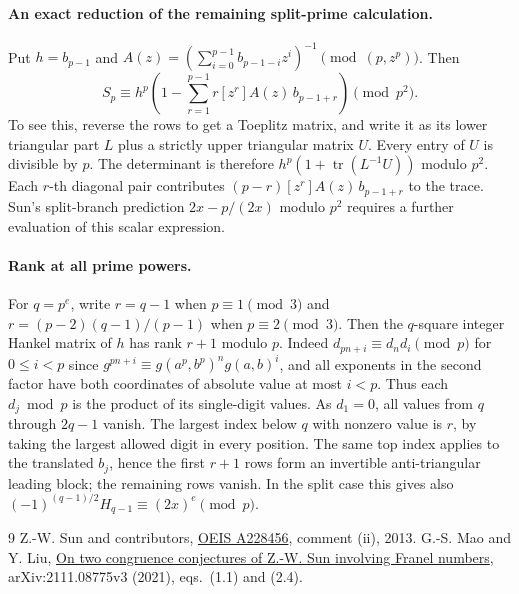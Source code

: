 \documentclass[11pt]{article}
\begin{document}
\paragraph{An exact reduction of the remaining split-prime calculation.}
Put $h=b_{p-1}$ and $A(z)=(\sum_{i=0}^{p-1}b_{p-1-i}z^i)^{-1}\pmod{(p,z^p)}$. Then
\[
 S_p\equiv h^p\left(1-\sum_{r=1}^{p-1}r[z^r]A(z)\,b_{p-1+r}\right)\pmod{p^2}.
\]
To see this, reverse the rows to get a Toeplitz matrix, and write it as its lower triangular part $L$ plus a strictly upper triangular matrix $U$. Every entry of $U$ is divisible by $p$. The determinant is therefore $h^p(1+\operatorname{tr}(L^{-1}U))$ modulo $p^2$. Each $r$-th diagonal pair contributes $(p-r)[z^r]A(z)\,b_{p-1+r}$ to the trace. Sun's split-branch prediction $2x-p/(2x)$ modulo $p^2$ requires a further evaluation of this scalar expression.

\paragraph{Rank at all prime powers.}
For $q=p^e$, write $r=q-1$ when $p\equiv1\pmod3$ and $r=(p-2)(q-1)/(p-1)$ when $p\equiv2\pmod3$. Then the $q$-square integer Hankel matrix of $h$ has rank $r+1$ modulo $p$. Indeed $d_{pn+i}\equiv d_nd_i\pmod p$ for $0\le i<p$ since $g^{pn+i}\equiv g(a^p,b^p)^ng(a,b)^i$, and all exponents in the second factor have both coordinates of absolute value at most $i<p$. Thus each $d_j\bmod p$ is the product of its single-digit values. As $d_1=0$, all values from $q$ through $2q-1$ vanish. The largest index below $q$ with nonzero value is $r$, by taking the largest allowed digit in every position. The same top index applies to the translated $b_j$, hence the first $r+1$ rows form an invertible anti-triangular leading block; the remaining rows vanish. In the split case this gives also
$(-1)^{(q-1)/2}H_{q-1}\equiv(2x)^e\pmod p$.

\begin{thebibliography}{9}
 Z.-W. Sun and contributors, \href{https://oeis.org/A228456}{OEIS A228456}, comment (ii), 2013.
 G.-S. Mao and Y. Liu, \href{https://arxiv.org/abs/2111.08775}{On two congruence conjectures of Z.-W. Sun involving Franel numbers}, arXiv:2111.08775v3 (2021), eqs.~(1.1) and (2.4).
\end{thebibliography}
\end{document}
